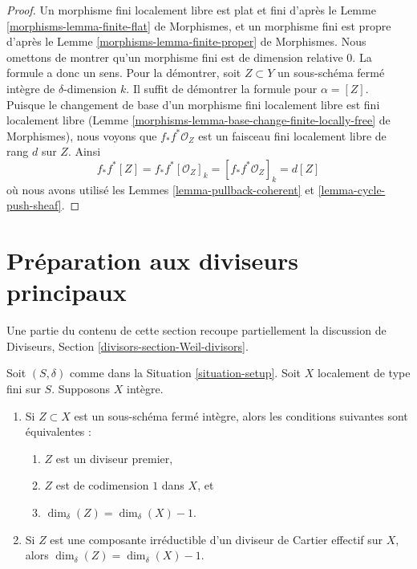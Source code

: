 \begin{proof}
Un morphisme fini localement libre est plat et fini d'après le
Lemme \ref{morphisms-lemma-finite-flat} de Morphismes,
et un morphisme fini est propre
d'après le Lemme \ref{morphisms-lemma-finite-proper} de Morphismes.
Nous omettons de montrer qu'un morphisme fini
est de dimension relative $0$. La formule a donc un sens.
Pour la démontrer, soit $Z \subset Y$ un sous-schéma fermé intègre
de $\delta$-dimension $k$. Il suffit de démontrer la formule
pour $\alpha = [Z]$. Puisque le changement de base d'un morphisme fini localement libre
est fini localement libre
(Lemme \ref{morphisms-lemma-base-change-finite-locally-free} de Morphismes),
nous voyons que $f_*f^*\mathcal{O}_Z$ est un faisceau fini localement libre de
rang $d$ sur $Z$. Ainsi
$$
f_*f^*[Z] = f_*f^*[\mathcal{O}_Z]_k =
[f_*f^*\mathcal{O}_Z]_k = d[Z]
$$
où nous avons utilisé les Lemmes \ref{lemma-pullback-coherent} et
\ref{lemma-cycle-push-sheaf}.
\end{proof}








\section{Préparation aux diviseurs principaux}
\label{section-preparation-principal-divisors}

\noindent
Une partie du contenu de cette section recoupe partiellement la
discussion de Diviseurs, Section \ref{divisors-section-Weil-divisors}.

\begin{lemma}
\label{lemma-divisor-delta-dimension}
Soit $(S, \delta)$ comme dans la Situation \ref{situation-setup}.
Soit $X$ localement de type fini sur $S$. Supposons $X$
intègre.
\begin{enumerate}
\item Si $Z \subset X$ est un sous-schéma fermé intègre, alors
les conditions suivantes sont équivalentes :
\begin{enumerate}
\item $Z$ est un diviseur premier,
\item $Z$ est de codimension $1$ dans $X$, et
\item $\dim_\delta(Z) = \dim_\delta(X) - 1$.
\end{enumerate}
\item Si $Z$ est une composante irréductible d'un diviseur de Cartier
effectif sur $X$, alors $\dim_\delta(Z) = \dim_\delta(X) - 1$.
\end{enumerate}
\end{lemma}

